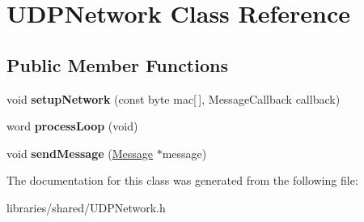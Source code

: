 \hypertarget{class_u_d_p_network}{}\section{U\+D\+P\+Network Class Reference}
\label{class_u_d_p_network}
\subsection*{Public Member Functions}
\begin{DoxyCompactItemize}
\item 
\mbox{\label{class_u_d_p_network_ab4b6d7233c9ae2036d3fae2fedf42501}} 
void {\bfseries setup\+Network} (const byte mac\mbox{[}$\,$\mbox{]}, Message\+Callback callback)
\item 
\mbox{\label{class_u_d_p_network_a6d3e6eb110e8c74ac88427f497330b00}} 
word {\bfseries process\+Loop} (void)
\item 
\mbox{\label{class_u_d_p_network_ad29266a3f891ffe5dadde6b182889666}} 
void {\bfseries send\+Message} (\hyperlink{class_message}{Message} $\ast$message)
\end{DoxyCompactItemize}


The documentation for this class was generated from the following file\+:\begin{DoxyCompactItemize}
\item 
libraries/shared/U\+D\+P\+Network.\+h\end{DoxyCompactItemize}

